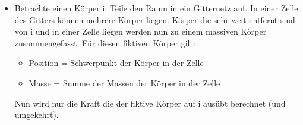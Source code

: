 \documentclass{article}
\begin{document}
\begin{enumerate}[a)]
\begin{itemize}
		\item Betrachte einen Körper i: Teile den Raum in ein Gitternetz auf. In einer Zelle des Gitters
	können mehrere Körper liegen. Körper die sehr weit entfernt sind von i und in einer Zelle liegen
	werden nun zu einem massiven Körper zusammengefasst. Für diesen fiktiven Körper gilt:
		\begin{itemize}
			\item Position = Schwerpunkt der Körper in der Zelle
			\item Masse = Summe der Massen der Körper in der Zelle
		\end{itemize}
	Nun wird nur die Kraft die der fiktive Körper auf i ausübt berechnet (und umgekehrt).
	\end{itemize}
\end{enumerate}
\end{document}
